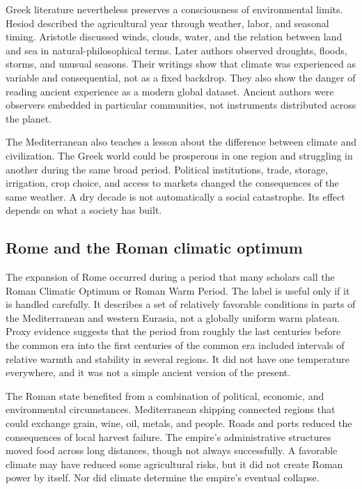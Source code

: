 ﻿\documentclass[12pt,a4paper]{book}
\begin{document}
Greek literature nevertheless preserves a consciousness of environmental limits. Hesiod described the agricultural year through weather, labor, and seasonal timing. Aristotle discussed winds, clouds, water, and the relation between land and sea in natural-philosophical terms. Later authors observed droughts, floods, storms, and unusual seasons. Their writings show that climate was experienced as variable and consequential, not as a fixed backdrop. They also show the danger of reading ancient experience as a modern global dataset. Ancient authors were observers embedded in particular communities, not instruments distributed across the planet.

The Mediterranean also teaches a lesson about the difference between climate and civilization. The Greek world could be prosperous in one region and struggling in another during the same broad period. Political institutions, trade, storage, irrigation, crop choice, and access to markets changed the consequences of the same weather. A dry decade is not automatically a social catastrophe. Its effect depends on what a society has built.

\subsection{Rome and the Roman climatic optimum}
The expansion of Rome occurred during a period that many scholars call the Roman Climatic Optimum or Roman Warm Period. The label is useful only if it is handled carefully. It describes a set of relatively favorable conditions in parts of the Mediterranean and western Eurasia, not a globally uniform warm plateau. Proxy evidence suggests that the period from roughly the last centuries before the common era into the first centuries of the common era included intervals of relative warmth and stability in several regions. It did not have one temperature everywhere, and it was not a simple ancient version of the present. \cite{McCormick2012,Neukom2019}

The Roman state benefited from a combination of political, economic, and environmental circumstances. Mediterranean shipping connected regions that could exchange grain, wine, oil, metals, and people. Roads and ports reduced the consequences of local harvest failure. The empire's administrative structures moved food across long distances, though not always successfully. A favorable climate may have reduced some agricultural risks, but it did not create Roman power by itself. Nor did climate determine the empire's eventual collapse.
\end{document}
